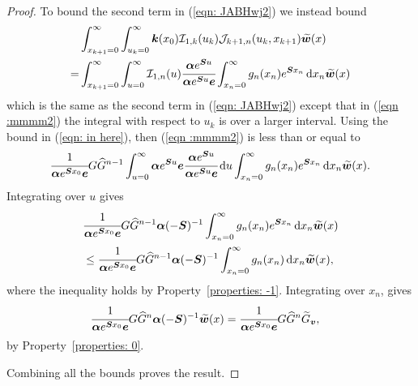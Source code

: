\begin{proof}
To bound the second term in (\ref{eqn: JABHwj2}) we instead bound 
	\begin{align}
		&\int_{x_{k+1}=0}^\infty \int_{u_k=0}^\infty \boldsymbol k(x_0)\mathcal I_{1,k}(u_k) \mathcal J_{k+1,n}(u_k,x_{k+1})\widetilde{\boldsymbol w}(x) \nonumber
		\\= &\int_{x_{k+1}=0}^\infty \int_{u=0}^\infty \mathcal I_{1,n}(u) \cfrac{\boldsymbol\alpha e^{\boldsymbol Su}}{\boldsymbol\alpha e^{\boldsymbol Su}\boldsymbol e}\int_{x_n=0}^\infty g_n(x_n)e^{\boldsymbol Sx_n}\, \mathrm{d} x_n\widetilde{\boldsymbol w}(x)
		\label{eqn :mmmm2}
	\end{align}
	which is the same as the second term in (\ref{eqn: JABHwj2}) except that in (\ref{eqn :mmmm2}) the integral with respect to \(u_k\) is over a larger interval. Using the bound in (\ref{eqn: in here}), then (\ref{eqn :mmmm2}) is less than or equal to 
	\begin{align*}
		\cfrac{1}{\boldsymbol \alpha e^{\boldsymbol{S}x_0}\boldsymbol e}G\widehat G^{n-1} \int_{u=0}^\infty \boldsymbol \alpha e^{\boldsymbol{S}u}\boldsymbol e \cfrac{\boldsymbol \alpha e^{\boldsymbol S u}}{\boldsymbol \alpha e^{\boldsymbol S u} \boldsymbol e}\, \mathrm{d} u \int_{x_n=0}^\infty g_{n}(x_n) e^{\boldsymbol{S}x_n} \, \mathrm{d} x_n \widetilde{\boldsymbol w}(x).
	\end{align*}
	Integrating over \(u\) gives 
	\begin{align*}
		&\cfrac{1}{\boldsymbol \alpha e^{\boldsymbol{S}x_0}\boldsymbol e}G\widehat G^{n-1} \boldsymbol \alpha (-\boldsymbol S)^{-1} \int_{x_n=0}^\infty g_{n}(x_n) e^{\boldsymbol{S}x_n} \, \mathrm{d} x_n \widetilde{\boldsymbol w}(x) 
		\\&\leq \cfrac{1}{\boldsymbol \alpha e^{\boldsymbol{S}x_0}\boldsymbol e}G\widehat G^{n-1} \boldsymbol \alpha (-\boldsymbol S)^{-1} \int_{x_n=0}^\infty g_{n}(x_n) \, \mathrm{d} x_n \widetilde{\boldsymbol w}(x),
	\end{align*}
	where the inequality holds by Property~\ref{properties: -1}. Integrating over \(x_n\), gives
	\begin{align}
		\cfrac{1}{\boldsymbol \alpha e^{\boldsymbol{S}x_0}\boldsymbol e}G\widehat G^{n} \boldsymbol \alpha (-\boldsymbol S)^{-1} \widetilde{\boldsymbol w}(x) 
		&=\cfrac{1}{\boldsymbol \alpha e^{\boldsymbol{S}x_0}\boldsymbol e}G\widehat G^{n}\widetilde G_{\boldsymbol v},\label{eqn:FGHJSjjs sj}
	\end{align}
	by Property~\ref{properties: 0}.

	Combining all the bounds proves the result. 
\end{proof}	

